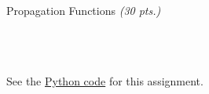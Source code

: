 \begin{hwkProblem}{1}{Propagation Functions \textit{(30 pts.)}}
	\inputminted{python}{./outputs/text/s01b.txt}

	\hwkPart{} \label{hwk:s01c}

	\inputminted{python}{./outputs/text/s01c.txt}

	\hwkPart{} \label{hwk:s01d}

	\inputminted{python}{./outputs/text/s01d.txt}

	\hwkPart{} \label{hwk:s01e}

	\inputminted{python}{./outputs/text/s01e.txt}

	\hwkCode{} \label{code:s01}

	See the \href{https://www.github.com/vaisriv/enae441-hw03/blob/main/src/hw03.py#L0}{Python code} for this assignment.

\end{hwkProblem}

